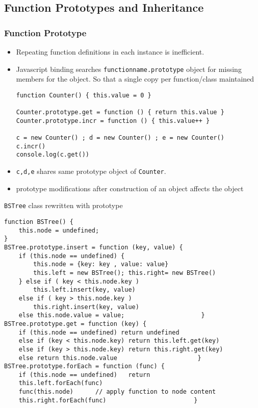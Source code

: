 \documentclass[trans,compress,xcolor=table]{beamer}
\begin{document}
\subsection*{Function Prototypes and Inheritance}
\begin{frame}[fragile]
\frametitle{Function Prototype}
\begin{itemize}
\item Repeating function definitions in each instance is inefficient.
\item Javascript binding searches \lstinline!functionname.prototype! object
for missing members for the object. So that a single copy per function/class maintained
\begin{lstlisting}
function Counter() { this.value = 0 }

Counter.prototype.get = function () { return this.value }
Counter.prototype.incr = function () { this.value++ }

c = new Counter() ; d = new Counter() ; e = new Counter()
c.incr()
console.log(c.get())
\end{lstlisting}
\item \lstinline!c,d,e!  shares same prototype object of \lstinline!Counter!.
\item \alert{prototype modifications after construction of an object affects the object}
\end{itemize}
\end{frame}

\begin{frame}[fragile]
\lstinline!BSTree! class rewritten with prototype
\begin{lstlisting}
function BSTree() {
    this.node = undefined;	
}
BSTree.prototype.insert = function (key, value) {
    if (this.node == undefined) {
        this.node = {key: key , value: value}
        this.left = new BSTree(); this.right= new BSTree()
    } else if ( key < this.node.key ) 
        this.left.insert(key, value)
    else if ( key > this.node.key )
        this.right.insert(key, value)
    else this.node.value = value;                     } 
BSTree.prototype.get = function (key) {
    if (this.node == undefined) return undefined
    else if (key < this.node.key) return this.left.get(key)
    else if (key > this.node.key) return this.right.get(key)
    else return this.node.value                      }
BSTree.prototype.forEach = function (func) {
    if (this.node == undefined)   return
    this.left.forEach(func)
    func(this.node)      // apply function to node content
    this.right.forEach(func)                        }
\end{lstlisting}
\end{frame}
\end{document}

